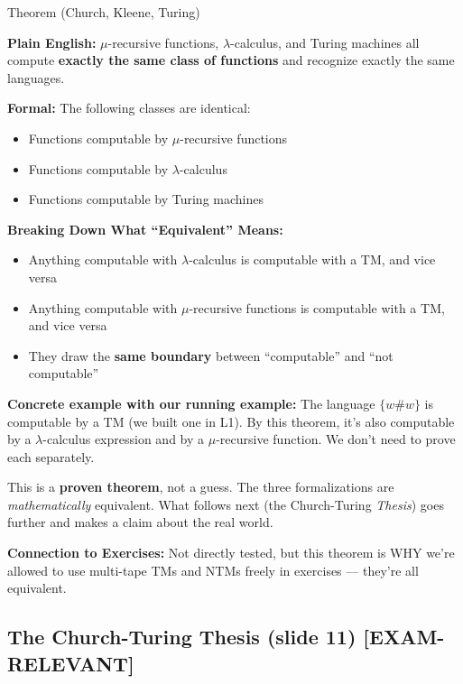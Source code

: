 \documentclass[11pt,a4paper]{article}
\newcommand{\kemark}{\textcolor{red!70!black}{\textbf{[EXAM-RELEVANT]}}}
\newcommand{\kt}[1]{\par\vspace{0.3em}\colorbox{yellow!60}{\parbox{\dimexpr\linewidth-2\fboxsep}{#1}}\vspace{0.3em}}
\begin{document}
\begin{definitionbox}{{Theorem (Church, Kleene, Turing)}}

\textbf{Plain English:} $\mu$-recursive functions, $\lambda$-calculus, and Turing machines all compute \textbf{exactly the same class of functions} and recognize exactly the same languages.

\textbf{Formal:} The following classes are identical:
\begin{itemize}[nosep]
\item Functions computable by $\mu$-recursive functions
\item Functions computable by $\lambda$-calculus
\item Functions computable by Turing machines
\end{itemize}

\textbf{Breaking Down What ``Equivalent'' Means:}
\begin{itemize}[nosep]
\item Anything computable with $\lambda$-calculus is computable with a TM, and vice versa
\item Anything computable with $\mu$-recursive functions is computable with a TM, and vice versa
\item They draw the \textbf{same boundary} between ``computable'' and ``not computable''
\end{itemize}

\textbf{Concrete example with our running example:} The language $\{w\#w\}$ is computable by a TM (we built one in L1). By this theorem, it's also computable by a $\lambda$-calculus expression and by a $\mu$-recursive function. We don't need to prove each separately.

\kt{This is a \textbf{proven theorem}, not a guess. The three formalizations are \textit{mathematically} equivalent. What follows next (the Church-Turing \textit{Thesis}) goes further and makes a claim about the real world.}

\textbf{Connection to Exercises:} Not directly tested, but this theorem is WHY we're allowed to use multi-tape TMs and NTMs freely in exercises --- they're all equivalent.
\end{definitionbox}

\subsection{The Church-Turing Thesis (slide 11) \kemark}
\end{document}
